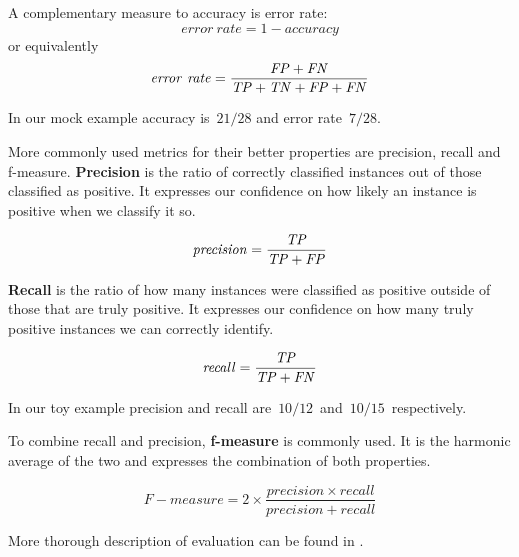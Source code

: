 A complementary measure to accuracy is error rate:
\begin{equation}
\mathit{error~rate} = 1 - \mathit{accuracy}
\end{equation}
or equivalently
\begin{equation}
\mathit{error~rate} = \frac{\mathit{FP} + \mathit{FN}}{\mathit{TP} + \mathit{TN} + \mathit{FP} + \mathit{FN}}
\end{equation}

In our mock example accuracy is~$21/28$ and error rate~$7/28$.

More commonly used metrics for their better properties are precision, recall and f-measure.
{\bf Precision} is the ratio of correctly classified instances out of those classified as positive.
It expresses our confidence on how likely an instance is positive when we classify it so.

\begin{equation}
\mathit{precision} = \frac{\mathit{TP}}{\mathit{TP} + \mathit{FP}}
\end{equation}

{\bf Recall} is the ratio of how many instances were classified as positive
outside of those that are truly positive.
It expresses our confidence on how many truly positive instances we can correctly identify.

\begin{equation}
\mathit{recall} = \frac{\mathit{TP}}{\mathit{TP} + \mathit{FN}}
\end{equation}

In our toy example precision and recall are~$10/12$~and~$10/15$~respectively.

To combine recall and precision, {\bf f-measure} is commonly used.
It is the harmonic average of the two and expresses the combination of both properties.

\begin{equation}
	\mathit{F-measure} = 2 \times \frac{\mathit{precision}\times \mathit{recall}}{\mathit{precision} + \mathit{recall}}
\end{equation}


More thorough description of evaluation can be found in .




